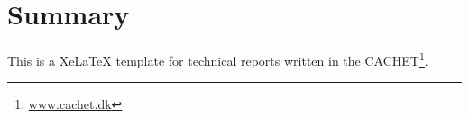 \chapter{Summary}
This is a XeLaTeX template for technical reports written in the \acf{CACHET}\footnote{\url{www.cachet.dk}}. 


